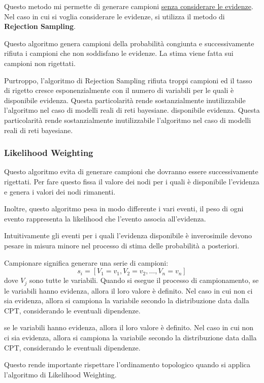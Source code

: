 Questo metodo mi permette di generare campioni \underline{senza considerare le
    evidenze}. Nel caso in cui si voglia considerare le evidenze, si utilizza il
metodo di \textbf{Rejection Sampling}.

Questo algoritmo genera campioni della probabilità congiunta e successivamente
rifiuta i campioni che non soddisfano le evidenze. La stima viene fatta sui
campioni non rigettati.

Purtroppo, l'algoritmo di Rejection Sampling rifiuta troppi campioni ed il tasso
di rigetto cresce esponenzialmente con il numero di variabili per le quali è
disponibile evidenza. Questa particolarità rende sostanzialmente inutilizzabile
l'algoritmo nel caso di modelli reali di reti bayesiane.
disponibile evidenza. Questa particolarità rende sostanzialmente inutilizzabile
l'algoritmo nel caso di modelli reali di reti bayesiane.

\subsubsection{Likelihood Weighting}
Questo algoritmo evita di generare campioni che dovranno essere successivamente
rigettati. Per fare questo fissa il valore dei nodi per i quali è disponibile
l'evidenza e genera i valori dei nodi rimanenti.

Inoltre, questo algoritmo pesa in modo differente i vari eventi, il peso di ogni
evento rappresenta la likelihood che l'evento associa all'evidenza.

Intuitivamente gli eventi per i quali l'evidenza disponibile è inverosimile devono
pesare in misura minore nel processo di stima delle probabilità a posteriori.

Campionare significa generare una serie di campioni:
\begin{equation*}
    s_i = \left[V_1=v_1, V_2= v_2, \dots, V_n=v_n\right]
\end{equation*}
dove $V_j$ sono tutte le variabili. Quando si esegue il processo di campionamento,
se le variabili hanno evidenza, allora il loro valore è definito. Nel caso in
cui non ci sia evidenza, allora si campiona la variabile secondo la distribuzione
data dalla CPT, considerando le eventuali dipendenze.

se le variabili hanno evidenza, allora il loro valore è definito. Nel caso in
cui non ci sia evidenza, allora si campiona la variabile secondo la distribuzione
data dalla CPT, considerando le eventuali dipendenze.


Questo rende importante rispettare l'ordinamento topologico quando si applica
l'algoritmo di Likelihood Weighting.

